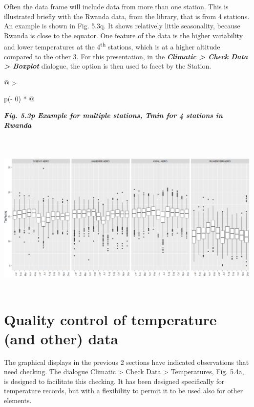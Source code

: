 \documentclass[
  letterpaper,
  DIV=11,
  numbers=noendperiod]{scrreprt}
\begin{document}
Often the data frame will include data from more than one station. This
is illustrated briefly with the Rwanda data, from the library, that is
from 4 stations. An example is shown in Fig. 5.3q. It shows relatively
little seasonality, because Rwanda is close to the equator. One feature
of the data is the higher variability and lower temperatures at the
4\textsuperscript{th} stations, which is at a higher altitude compared
to the other 3. For this presentation, in the \textbf{\emph{Climatic
\textgreater{} Check Data \textgreater{} Boxplot}} dialogue, the option
is then used to facet by the Station.

\begin{longtable}[]{@{}
  >{\raggedright\arraybackslash}p{(\columnwidth - 0\tabcolsep) * }@{}}
\toprule\noalign{}
\begin{minipage}[b]{\linewidth}\raggedright
\textbf{\emph{Fig. 5.3p Example for multiple stations, Tmin for 4
stations in Rwanda}}
\end{minipage} \\
\midrule\noalign{}
\endhead
\bottomrule\noalign{}
\endlastfoot
\includegraphics[width=6.16671in,height=3.0205in]{figures/Fig5.3p.png} \\
\end{longtable}

\section{Quality control of temperature (and other)
data}\label{quality-control-of-temperature-and-other-data}

The graphical displays in the previous 2 sections have indicated
observations that need checking. The dialogue Climatic \textgreater{}
Check Data \textgreater{} Temperatures, Fig. 5.4a, is designed to
facilitate this checking. It has been designed specifically for
temperature records, but with a flexibility to permit it to be used also
for other elements.
\end{document}
